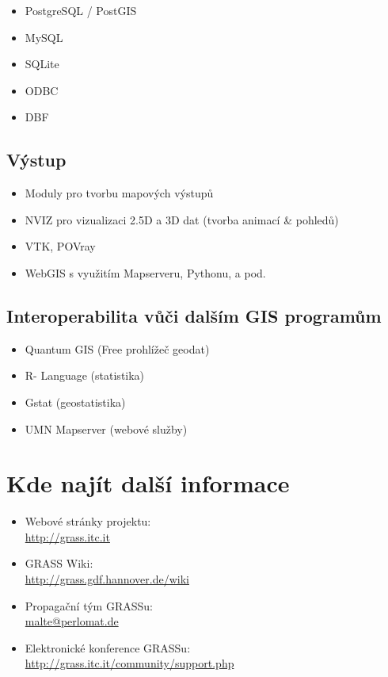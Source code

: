 \documentclass[notumble,a4paper,10pt,nofoldmark]{leaflet}
\newcommand{\GRASSurl}{\url{http://grass.itc.it}}
\begin{document}
\begin{itemize}
\item PostgreSQL / PostGIS
\item MySQL
\item SQLite
\item ODBC
\item DBF
\end{itemize}

\subsection{Výstup}

\begin{itemize}
\item Moduly pro tvorbu mapových výstupů
\item NVIZ pro vizualizaci 2.5D a 3D dat (tvorba animací \& pohledů)
\item VTK, POVray
\item WebGIS s využitím Mapserveru, Pythonu, a pod.
\end{itemize}

\subsection{Interoperabilita vůči dalším  GIS programům}

\begin{itemize}
\item Quantum GIS (Free prohlížeč geodat)
\item R- Language (statistika)
\item Gstat (geostatistika)
\item UMN Mapserver (webové služby)
\end{itemize}

\section{Kde najít další informace}

\begin{itemize}
\item{Webové stránky projektu: \\\GRASSurl}
\item{GRASS Wiki: \\\url{http://grass.gdf.hannover.de/wiki}}
\item{Propagační tým GRASSu: \\\url{malte@perlomat.de}}
\item{Elektronické konference GRASSu:
    \\\url{http://grass.itc.it/community/support.php}}
\end{itemize}
\end{document}

